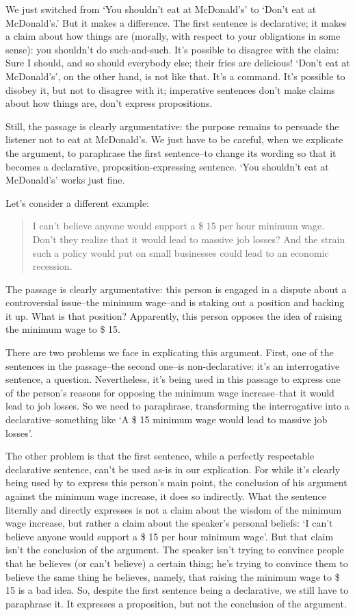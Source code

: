 We just switched from `You shouldn't eat at McDonald's' to `Don't eat at McDonald's.' But it
makes a difference. The first sentence is declarative; it makes a claim about how things are
(morally, with respect to your obligations in some sense): you shouldn't do such-and-such. It's
possible to disagree with the claim: Sure I should, and so should everybody else; their fries are
delicious! `Don't eat at McDonald's', on the other hand, is not like that. It's a command. It's
possible to disobey it, but not to disagree with it; imperative sentences don't make claims about
how things are, don't express propositions.

Still, the passage is clearly argumentative: the purpose remains to persuade the listener not to eat
at McDonald's. We just have to be careful, when we explicate the argument, to paraphrase the first
sentence--to change its wording so that it becomes a declarative, proposition-expressing sentence.
`You shouldn't eat at McDonald's' works just fine.

Let's consider a different example:

\begin{quotation}
I can't believe anyone would support a \$ 15 per hour minimum wage. Don't they realize
that it would lead to massive job losses? And the strain such a policy would put on small
businesses could lead to an economic recession.
\end{quotation}

The passage is clearly argumentative: this person is engaged in a dispute about a controversial
issue--the minimum wage--and is staking out a position and backing it up. What is that position?
Apparently, this person opposes the idea of raising the minimum wage to \$ 15.

There are two problems we face in explicating this argument. First, one of the sentences in the
passage--the second one--is non-declarative: it's an interrogative sentence, a question.
Nevertheless, it's being used in this passage to express one of the person's reasons for opposing
the minimum wage increase--that it would lead to job losses. So we need to paraphrase,
transforming the interrogative into a declarative--something like `A \$ 15 minimum wage would
lead to massive job losses'.

The other problem is that the first sentence, while a perfectly respectable declarative sentence,
can't be used as-is in our explication. For while it's clearly being used by to express this person's
main point, the conclusion of his argument against the minimum wage increase, it does so
indirectly. What the sentence literally and directly expresses is not a claim about the wisdom of
the minimum wage increase, but rather a claim about the speaker's personal beliefs: `I can't believe
anyone would support a \$ 15 per hour minimum wage'. But that claim isn't the conclusion of the
argument. The speaker isn't trying to convince people that he believes (or can't believe) a certain
thing; he's trying to convince them to believe the same thing he believes, namely, that raising the
minimum wage to \$ 15 is a bad idea. So, despite the first sentence being a declarative, we still have
to paraphrase it. It expresses a proposition, but not the conclusion of the argument.

